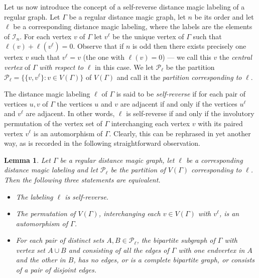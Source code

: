 \documentclass[11 pt,english]{article}
\newcommand{\G}{\Gamma}
\newcommand{\cP}{\mathcal{P}}
\newtheorem{lemma}[theorem]{Lemma}
\theoremstyle{definition}
\begin{document}
Let us now introduce the concept of a self-reverse distance magic labeling of a regular graph. Let $\G$ be a regular distance magic graph, let $n$ be its order and let $\ell$ be a corresponding distance magic labeling, where the labels are the elements of $\mathcal{I}_n$. For each vertex $v$ of $\G$ let $v^\ell$ be the unique vertex of $\G$ such that $\ell(v) + \ell(v^\ell) = 0$. Observe that if $n$ is odd then there exists precisely one vertex $v$ such that $v^{\ell} = v$ (the one with $\ell(v) = 0$) --- we call this $v$ the {\em central vertex} of $\G$ {\em with respect to} $\ell$ in this case. We let $\cP_\ell$ be the partition $\cP_\ell = \{\{v, v^{\ell}\} \colon v \in V(\G)\}$ of $V(\G)$ and call it the {\em partition corresponding to} $\ell$. 

The distance magic labeling $\ell$ of $\G$ is said to be {\em self-reverse} if for each pair of vertices $u, v$ of $\G$ the vertices $u$ and $v$ are adjacent if and only if the vertices $u^\ell$ and $v^\ell$ are adjacent. In other words, $\ell$ is self-reverse if and only if the involutory permutation of the vertex set of $\G$ interchanging each vertex $v$ with its paired vertex $v^\ell$ is an automorphism of $\G$. Clearly, this can be rephrased in yet another way, as is recorded in the following straightforward observation.

\begin{lemma}
\label{le:obser}
Let $\G$ be a regular distance magic graph, let $\ell$ be a corresponding distance magic labeling and let $\cP_\ell$ be the partition of $V(\G)$ corresponding to $\ell$. Then the following three statements are equivalent. 
\begin{itemize}
\itemsep = 0pt
	\item[(i)] The labeling $\ell$ is self-reverse.
	\item[(ii)] The permutation of $V(\G)$, interchanging each $v \in V(\G)$ with $v^\ell$, is an automorphism of $\G$.
	\item[(iii)] For each pair of distinct sets $A, B \in \cP_\ell$, the bipartite subgraph of $\G$ with vertex set $A \cup B$ and consisting of all the edges of $\G$ with one endvertex in $A$ and the other in $B$, has no edges, or is a complete bipartite graph, or consists of a pair of disjoint edges.
\end{itemize}
\end{lemma}
\end{document}
